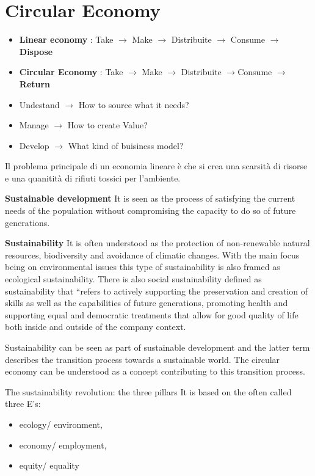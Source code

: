 \section{Circular Economy}

\begin{itemize}
\item \textbf{Linear economy} : Take $\rightarrow$ Make  $\rightarrow$ Distribuite $\rightarrow$ Consume  $\rightarrow$ \textbf{ Dispose}
\item \textbf{Circular Economy} :  Take  $\rightarrow$ Make  $\rightarrow$ Distribuite $\rightarrow$Consume  $\rightarrow$  \textbf{Return}
\end{itemize}



\begin{itemize}
	\item Undestand $\rightarrow$ How to source what it needs?
	\item Manage  $\rightarrow$ How to create Value?
	\item Develop  $\rightarrow$ What kind of buisiness model?
\end{itemize}

Il problema principale di un economia lineare è che si crea una scarsità di risorse e una quanitità di rifiuti tossici per l'ambiente.

\textbf{Sustainable development}
It is seen as the process of satisfying the current needs of the population without compromising the
capacity to do so of future generations.

\textbf{Sustainability}
It is often understood as the protection of non-renewable natural resources, biodiversity and avoidance
of climatic changes.
With the main focus being on environmental issues this type of sustainability is also framed as ecological
sustainability. There is also social sustainability defined as sustainability that “refers to actively supporting
the preservation and creation of skills as well as the capabilities of future generations, promoting health
and supporting equal and democratic treatments that allow for good quality of life both inside and
outside of the company context.

Sustainability can be seen as part of sustainable development and the latter term describes
the transition process towards a sustainable world.
The circular economy can be understood as a concept contributing to this transition process.

The sustainability revolution: the three pillars
It is based on the often called three E’s:
\begin{itemize}
\item ecology/ environment,
\item economy/ employment,
\item equity/ equality
\end{itemize}


